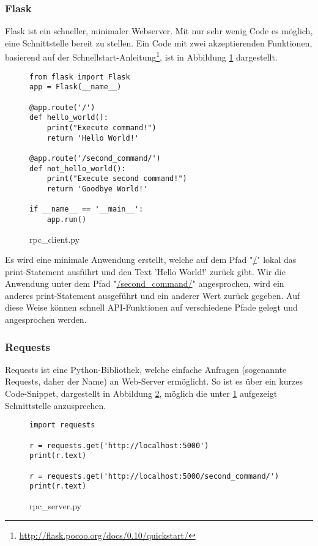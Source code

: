 \subsubsection{Flask}\label{ref:flask}
Flask ist ein schneller, minimaler Webserver. Mit nur sehr wenig Code es möglich, eine Schnittstelle bereit zu stellen. Ein Code mit zwei akzeptierenden Funktionen, basierend auf der Schnellstart-Anleitung\footnote{\url{http://flask.pocoo.org/docs/0.10/quickstart/}}, ist in Abbildung \ref{ref:rpc_client.py} dargestellt.
\begin{figure}
\begin{lstlisting}
from flask import Flask
app = Flask(__name__)

@app.route('/')
def hello_world():
	print("Execute command!")
    return 'Hello World!'
    
@app.route('/second_command/')
def not_hello_world():
	print("Execute second command!")
    return 'Goodbye World!'

if __name__ == '__main__':
    app.run()
\end{lstlisting}
\label{ref:rpc_client.py}
\caption{rpc\_client.py}
\end{figure}

Es wird eine minimale Anwendung erstellt, welche auf dem Pfad "\url{/}" lokal das print-Statement ausführt und den Text 'Hello World!' zurück gibt. 
Wir die Anwendung unter dem Pfad "\url{/second_command/}" angesprochen, wird ein anderes print-Statement ausgeführt und ein anderer Wert zurück gegeben. Auf diese Weise können schnell API-Funktionen auf verschiedene Pfade gelegt und angesprochen werden.

\subsubsection{Requests}
Requests ist eine Python-Bibliothek, welche einfache Anfragen (sogenannte Requests, daher der Name) an Web-Server ermöglicht. So ist es über ein kurzes Code-Snippet, dargestellt in Abbildung \ref{ref:rpc_server.py}, möglich die unter \ref{ref:rpc_client.py} aufgezeigt Schnittstelle anzusprechen.

\begin{figure}
\begin{lstlisting}
import requests

r = requests.get('http://localhost:5000')
print(r.text)

r = requests.get('http://localhost:5000/second_command/')
print(r.text)
\end{lstlisting}
\label{ref:rpc_server.py}
\caption{rpc\_server.py}
\end{figure}

